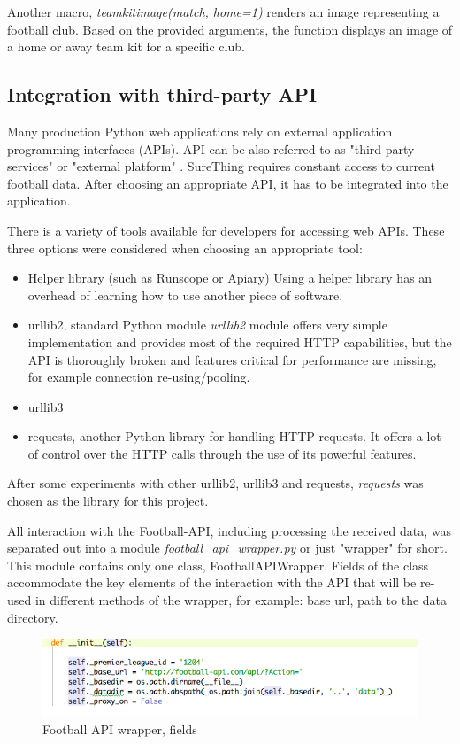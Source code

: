 Another macro, \emph{teamkitimage(match, home=1)} renders an image representing a football club. Based on the provided arguments, the function displays an image of a home or away team kit for a specific club.

\subsection{Integration with third-party API}
Many production Python web applications rely on external application programming interfaces (APIs). API can be also referred to as "third party services" or "external platform" \citep{article:API_Integration}.  SureThing requires constant access to current football data. After choosing an appropriate API, it has to be integrated into the application.

There is a variety of tools available for developers for accessing web APIs. These three options were considered when choosing an appropriate tool:
	
\begin{itemize}
	\item Helper library (such as Runscope or Apiary)
	Using a helper library has an overhead of learning how to use another piece of software.
	\item urllib2, standard Python module
	\emph{urllib2} module offers very simple implementation and provides most of the required HTTP capabilities, but the API is thoroughly broken and features critical for performance are missing, for example connection re-using/pooling.
	\item urllib3
	\item requests, another Python library for handling HTTP requests. It offers a lot of control over the HTTP calls through the use of its powerful features.
\end{itemize}
		
After some experiments with other urllib2, urllib3 and requests, \emph{requests} was chosen as the library for this project.
		
All interaction with the Football-API, including processing the received data, was separated out into a module \emph{football\_api\_wrapper.py} or just "wrapper" for short. This module contains only one class, FootballAPIWrapper. Fields of the class accommodate the key elements of the interaction with the API that will be re-used in different methods of the wrapper, for example: base url, path to the data directory.
	
\begin{figure}[H]
	\begin{center}
		\includegraphics[width=.90\textwidth]{impl/images/footballApiWrapperFields}
		\caption{Football API wrapper, fields} \label{fig:using:footballapiwrapperfields}
	\end{center}
\end{figure}
	
